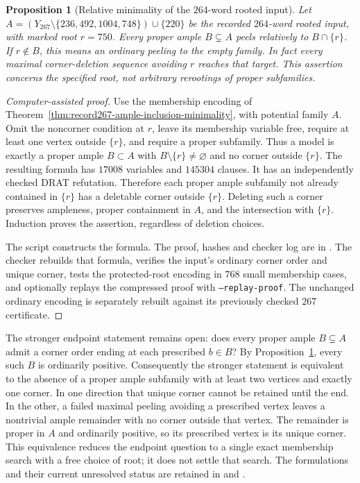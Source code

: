 \documentclass[11pt]{article}
\numberwithin{equation}{section}
\newtheorem{proposition}[theorem]{Proposition}
\theoremstyle{definition}
\theoremstyle{remark}
\begin{document}
\begin{proposition}[Relative minimality of the $264$-word rooted input]
\label{prop:root264-relative-ample-inclusion}
Let $A=(Y_{267}\setminus\{236,492,1004,748\})\cup\{220\}$ be the
recorded $264$-word rooted input, with marked root $r=750$.
Every proper ample $B\subsetneq A$ peels relatively to $B\cap\{r\}$.
If $r\notin B$, this means an ordinary peeling to the empty family.
In fact every maximal corner-deletion sequence avoiding $r$ reaches
that target. This assertion concerns the specified root, not arbitrary
rerootings of proper subfamilies.
\end{proposition}
\begin{proof}[Computer-assisted proof]
Use the membership encoding of
Theorem~\ref{thm:record267-ample-inclusion-minimality}, with potential
family $A$. Omit the noncorner condition at $r$, leave its membership
variable free, require at least one vertex outside $\{r\}$, and require
a proper subfamily. Thus a model is exactly a proper ample $B\subset A$
with $B\setminus\{r\}\ne\varnothing$ and no corner outside $\{r\}$.
The resulting formula has $17008$ variables and $145304$ clauses.
It has an independently checked DRAT refutation. Therefore each proper
ample subfamily not already contained in $\{r\}$ has a deletable
corner outside $\{r\}$. Deleting such a corner preserves ampleness,
proper containment in $A$, and the intersection with $\{r\}$.
Induction proves the assertion, regardless of deletion choices.

The script  constructs the
formula. The proof, hashes and checker log are in
. The checker
 rebuilds that formula,
verifies the input's ordinary corner order and unique corner, tests the
protected-root encoding in $768$ small membership cases, and optionally
replays the compressed proof with \texttt{--replay-proof}.
The unchanged ordinary encoding is separately rebuilt against its
previously checked $267$ certificate.
\end{proof}

The stronger endpoint statement remains open: does every proper ample
$B\subsetneq A$ admit a corner order ending at each prescribed $b\in B$?
By Proposition~\ref{prop:root264-relative-ample-inclusion}, every such $B$
is ordinarily positive. Consequently the stronger statement is equivalent
to the absence of a proper ample subfamily with at least two vertices and
exactly one corner. In one direction that unique corner cannot be retained
until the end. In the other, a failed maximal peeling avoiding a prescribed
vertex leaves a nontrivial ample remainder with no corner outside that
vertex. The remainder is proper in $A$ and ordinarily positive, so its
prescribed vertex is its unique corner. This equivalence reduces the
endpoint question to a single exact membership search with a free choice
of root; it does not settle that search. The formulations and their current
unresolved status are retained in
 and
.
\end{document}
